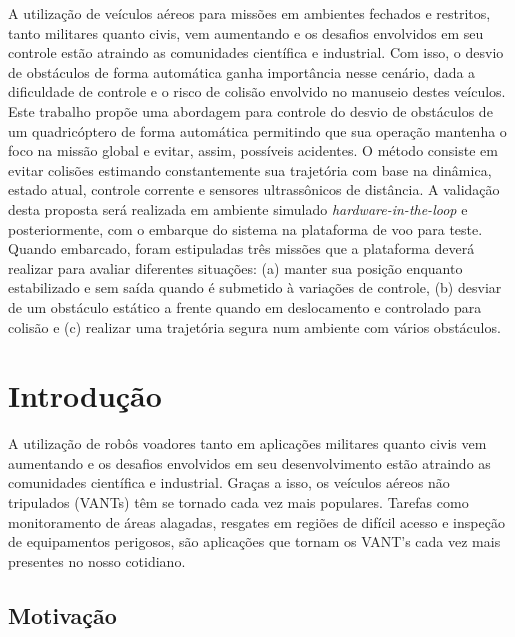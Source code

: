 \documentclass[a4paper, 12pt]{article}
\begin{document}
\newpage

\abstract

A utilização de veículos aéreos para missões em ambientes fechados e restritos, tanto militares quanto civis, vem aumentando e os desafios envolvidos em seu controle estão atraindo as comunidades científica e industrial. Com isso, o desvio de obstáculos de forma automática ganha importância nesse cenário, dada a dificuldade de controle e o risco de colisão envolvido no manuseio destes veículos. Este trabalho propõe uma abordagem para controle do desvio de obstáculos de um quadricóptero de forma automática permitindo que sua operação mantenha o foco na missão global e evitar, assim, possíveis acidentes. 
O método consiste em evitar colisões estimando constantemente sua trajetória com base na dinâmica, estado atual, controle corrente e sensores ultrassônicos de distância. A validação desta proposta será realizada em ambiente simulado \textit{hardware-in-the-loop} e posteriormente, com o embarque do sistema na plataforma de voo para teste. Quando embarcado, foram estipuladas três missões que a plataforma deverá realizar para avaliar diferentes situações: (a) manter sua posição enquanto estabilizado e sem saída quando é submetido à variações de controle, (b) desviar de um obstáculo estático a frente quando em deslocamento e controlado para colisão e (c) realizar uma trajetória segura num ambiente com vários obstáculos. 
 
\newpage

\section{Introdução}

A utilização de robôs voadores tanto em aplicações militares quanto civis vem aumentando e os desafios envolvidos em seu desenvolvimento estão atraindo as comunidades científica e industrial. Graças a isso, os veículos aéreos não tripulados (VANTs) têm se tornado cada vez mais populares. Tarefas como monitoramento de áreas alagadas, resgates em regiões de difícil acesso e inspeção de equipamentos perigosos, são aplicações que tornam os VANT's cada vez mais presentes no nosso cotidiano.

\subsection{Motivação}
\end{document}
